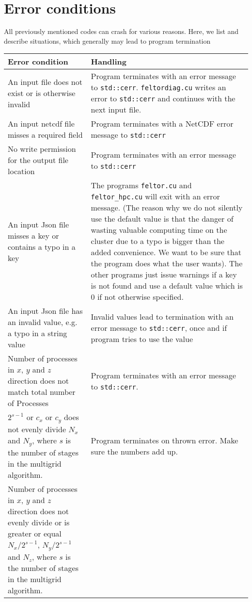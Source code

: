 \section{Error conditions}
All previously mentioned codes can crash for various reasons. Here,
we list and describe situations, which generally may lead to program
termination
\begin{longtable}{p{6cm}p{8cm}}
\toprule
\rowcolor{gray!50}\textbf{Error condition} &  \textbf{Handling} \\ \midrule
An input file does not exist or is otherwise invalid
&
Program terminates with an error message to \texttt{std::cerr}. \texttt{feltordiag.cu} writes an error to \texttt{std::cerr} and continues with the next input file.
    \\
An input netcdf file misses a required field
&
Program terminates with a NetCDF error message to \texttt{std::cerr}
    \\
No write permission for the output file location
&
Program terminates with an error message to \texttt{std::cerr}
    \\
An input Json file misses a key or contains a typo in a key
&
The programs \texttt{feltor.cu} and \texttt{feltor\_hpc.cu}
will exit with an error message. (The reason why we do not
silently use the default value is that the danger of wasting
valuable computing time on the cluster due to a typo is bigger than the
added convenience. We want to be sure that the program
does what the user wants).
The other programs just issue warnings
if a key is not found and use a default value
which is $0$ if not otherwise specified.
    \\
    An input Json file has an invalid value, e.g. a typo in a string value
&
Invalid values lead to termination with an error message to \texttt{std::cerr}, once and if program tries to use the value
    \\
    Number of processes in $x$, $y$ and $z$ direction does not match total number of Processes
&
Program terminates with an error message to \texttt{std::cerr}.
    \\
    $2^{s-1}$ or $c_x$ or $c_y$ does not evenly divide $N_x$ and $N_y$, where $s$ is the number of stages in the multigrid algorithm.
&
Program terminates on thrown error. Make sure the numbers add up.
    \\
    Number of processes in $x$, $y$ and $z$ direction does not evenly divide or is greater or equal $N_x/2^{s-1}$, $N_y/2^{s-1}$ and $N_z$, where $s$ is the number of stages in the multigrid algorithm.
&

\end{longtable}
